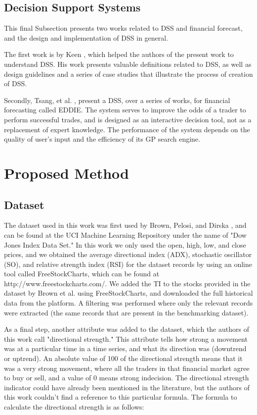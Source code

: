 \documentclass[a4paper,twoside]{article}
\begin{document}
\subsection{Decision Support Systems}
\label{decision-support-systems}

This final Subsection presents two works related to DSS and financial forecast, and the design and implementation of DSS in general.

The first work is by Keen \cite{keen1980decision}, which helped the authors of the present work to understand DSS. His work presents valuable definitions related to DSS, as well as design guidelines and a series of case studies that illustrate the process of creation of DSS.

Secondly, Tsang, et al. \cite{tsang1998eddie} \cite{tsang2000eddie} \cite{Tsang2004}  \cite{Tsang2008}, present a DSS, over a series of works, for financial forecasting called EDDIE. The system serves to improve the odds of a trader to perform successful trades, and is designed as an interactive decision tool, not as a replacement of expert knowledge. The performance of the system depends on the quality of user's input and the efficiency of its GP search engine.

\section{Proposed Method}
\label{proposed-method}

\subsection{Dataset}
\label{dataset}

The dataset used in this work was first used by Brown, Pelosi, and Dirska \cite{brown2013dynamic}, and can be found at the UCI Machine Learning Repository under the name of "Dow Jones Index Data Set." In this work we only used the open, high, low, and close prices, and we obtained the average directional index (ADX), stochastic oscillator (SO), and relative strength index (RSI) for the dataset records by using an online tool called FreeStockCharts, which can be found at http://www.freestockcharts.com/. We added the TI to the stocks provided in the dataset by Brown et al. using FreeStockCharts, and downloaded the full historical data from the platform. A filtering was performed where only the relevant records were extracted (the same records that are present in the benchmarking dataset).

As a final step, another attribute was added to the dataset, which the authors of this work call "directional strength." This attribute tells how strong a movement was at a particular time in a time series, and what its direction was (downtrend or uptrend). An absolute value of 100 of the directional strength means that it was a very strong movement, where all the traders in that financial market agree to buy or sell, and a value of 0 means strong indecision. The directional strength indicator could have already been mentioned in the literature, but the authors of this work couldn't find a reference to this particular formula. The formula to calculate the directional strength is as follows:
\end{document}
